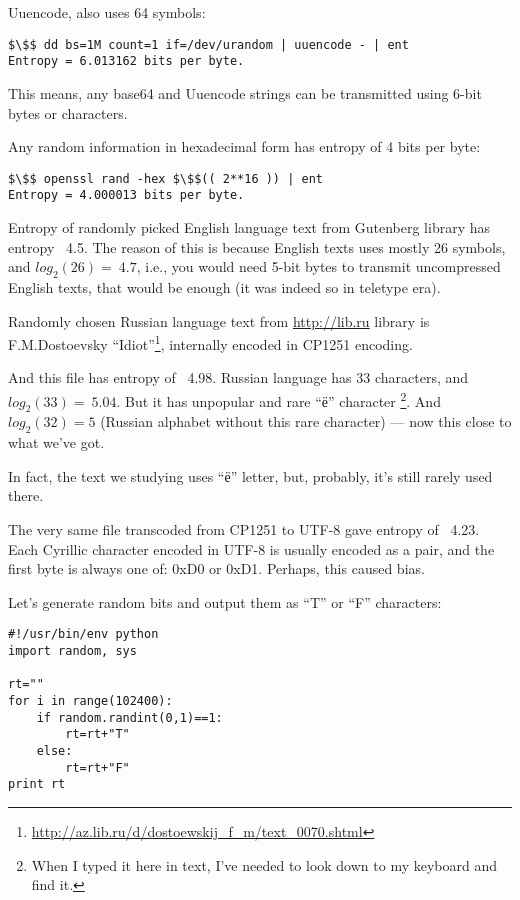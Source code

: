 Uuencode, also uses 64 symbols:

\begin{lstlisting}[basicstyle=\ttfamily, mathescape]
$\$$ dd bs=1M count=1 if=/dev/urandom | uuencode - | ent
Entropy = 6.013162 bits per byte.
\end{lstlisting}

This means, any base64 and Uuencode strings can be transmitted using 6-bit bytes or characters.

Any random information in hexadecimal form has entropy of 4 bits per byte:

\begin{lstlisting}[basicstyle=\ttfamily, mathescape]
$\$$ openssl rand -hex $\$$(( 2**16 )) | ent
Entropy = 4.000013 bits per byte.
\end{lstlisting}

Entropy of randomly picked English language text from Gutenberg library has entropy ~4.5.
The reason of this is because English texts uses mostly 26 symbols, and $log_2(26)=~4.7$, i.e., you would need
5-bit bytes to transmit uncompressed English texts, that would be enough (it was indeed so in teletype era).

Randomly chosen Russian language text from \url{http://lib.ru}
library is F.M.Dostoevsky ``Idiot''\footnote{\url{http://az.lib.ru/d/dostoewskij_f_m/text_0070.shtml}},
internally encoded in CP1251 encoding.

And this file has entropy of ~4.98.
Russian language has 33 characters, and $log_2(33)=~5.04$.
But it has unpopular and rare ``ё'' character
\footnote{When I typed it here in text, I've needed to look down to my keyboard and find it.}.
And $log_2(32)=5$ (Russian alphabet without this rare character) --- now this close to what we've got.

In fact, the text we studying uses ``ё'' letter, but, probably, it's still rarely used there.

The very same file transcoded from CP1251 to UTF-8 gave entropy of ~4.23.
Each Cyrillic character encoded in UTF-8 is usually encoded as a pair,
and the first byte is always one of: 0xD0 or 0xD1.
Perhaps, this caused bias.

Let's generate random bits and output them as ``T'' or ``F'' characters:

\begin{lstlisting}[style=custompy]
#!/usr/bin/env python
import random, sys

rt=""
for i in range(102400):
    if random.randint(0,1)==1:
        rt=rt+"T"
    else:
        rt=rt+"F"
print rt
\end{lstlisting}

